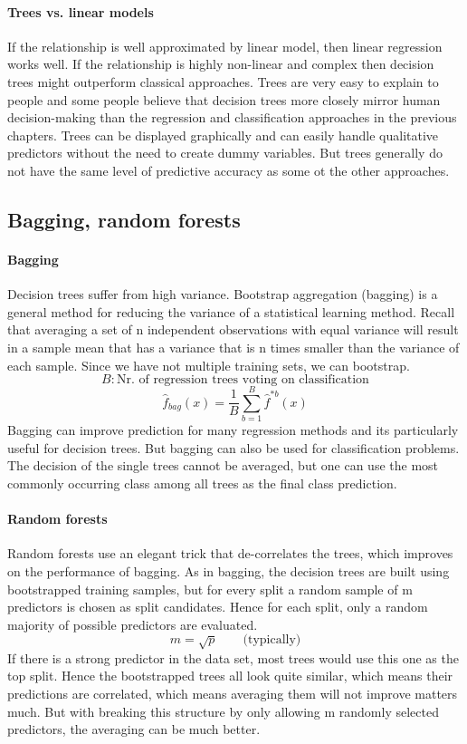 \documentclass[../document.tex]{subfiles}
\begin{document}
	\paragraph{Trees vs. linear models}
	If the relationship is well approximated by linear model, then linear regression works well. If the relationship is highly non-linear and complex then decision trees might outperform classical approaches. Trees are very easy to explain to people and some people believe that decision trees more closely mirror human decision-making than the regression and classification approaches in the previous chapters. Trees can be displayed graphically and can easily handle qualitative predictors without the need to create dummy variables. But trees generally do not have the same level of predictive accuracy as some ot the other approaches.
	\subsection{Bagging, random forests}
	\paragraph{Bagging}
	Decision trees suffer from high variance. Bootstrap aggregation (bagging) is a general method for reducing the variance of a statistical learning method. Recall that averaging a set of n independent observations with equal variance will result in a sample mean that has a variance that is n times smaller than the variance of each sample.
	Since we have not multiple training sets, we can bootstrap.
	\begin{equation*}
		B: \text{Nr. of regression trees voting on classification}
	\end{equation*}
	\begin{equation}
		\hat{f}_{bag}(x)=\frac{1}{B}\sum_{b=1}^{B}\hat{f}^{*b}(x)
	\end{equation}
	Bagging can improve prediction for many regression methods and its particularly useful for decision trees. But bagging can also be used for classification problems. The decision of the single trees cannot be averaged, but one can use the most commonly occurring class among all trees as the final class prediction.
	\paragraph{Random forests}
	Random forests use an elegant trick that de-correlates the trees, which improves on the performance of bagging. As in bagging, the decision trees are built using bootstrapped training samples, but for every split a random sample of m predictors is chosen as split candidates. Hence for each split, only a random majority of possible predictors are evaluated.\
	\begin{equation}
		m=\sqrt{p} \qquad \text{(typically)}
	\end{equation}
	If there is a strong predictor in the data set, most trees would use this one as the top split. Hence the bootstrapped trees all look quite similar, which means their predictions are correlated, which means averaging them will not improve matters much. But with breaking this structure by only allowing m randomly selected predictors, the averaging can be much better.
\end{document}
